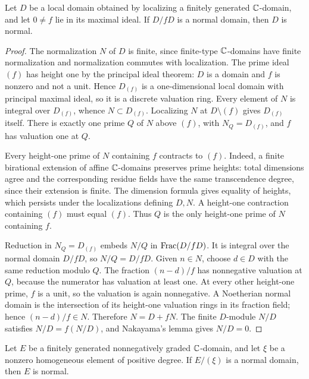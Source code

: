 \begin{lemma}\label{nb:deformation}
Let $D$ be a local domain obtained by localizing a finitely generated
$\mathbb C$-domain, and let $0\ne f$ lie in its maximal ideal. If $D/fD$
is a normal domain, then $D$ is normal.
\end{lemma}

\begin{proof}
The normalization $N$ of $D$ is finite, since finite-type
$\mathbb C$-domains have finite normalization and normalization commutes
with localization. The prime ideal $(f)$ has height one by the
principal ideal theorem: $D$ is a domain and $f$ is nonzero and
not a unit. Hence $D_{(f)}$ is a one-dimensional local domain with
principal maximal ideal, so it is a discrete valuation ring.
Every element of $N$ is integral over $D_{(f)}$, whence
$N\subset D_{(f)}$. Localizing $N$ at $D\setminus(f)$ gives
$D_{(f)}$ itself. There is exactly one prime $Q$ of $N$ above
$(f)$, with $N_Q=D_{(f)}$, and $f$ has valuation one at $Q$.

Every height-one prime of $N$ containing $f$ contracts to $(f)$.
Indeed, a finite birational extension of affine $\mathbb C$-domains
preserves prime heights: total dimensions agree and the corresponding
residue fields have the same transcendence degree, since their
extension is finite. The dimension formula gives equality of heights,
which persists under the localizations defining $D,N$. A height-one
contraction containing $(f)$ must equal $(f)$. Thus $Q$ is the only
height-one prime of $N$ containing $f$.

Reduction in $N_Q=D_{(f)}$ embeds $N/Q$ in $\operatorname{Frac}(D/fD)$.
It is integral over the normal domain $D/fD$, so $N/Q=D/fD$.
Given $n\in N$, choose $d\in D$ with the same reduction modulo $Q$.
The fraction $(n-d)/f$ has nonnegative valuation at $Q$, because the
numerator has valuation at least one. At every other height-one
prime, $f$ is a unit, so the valuation is again nonnegative. A
Noetherian normal domain is the intersection of its height-one
valuation rings in its fraction field; hence $(n-d)/f\in N$.
Therefore $N=D+fN$. The finite $D$-module $N/D$ satisfies
$N/D=f(N/D)$, and Nakayama's lemma gives $N/D=0$.
\end{proof}

\begin{corollary}\label{nb:graded-deformation}
Let $E$ be a finitely generated nonnegatively graded $\mathbb C$-domain,
and let $\xi$ be a nonzero homogeneous element of positive degree.
If $E/(\xi)$ is a normal domain, then $E$ is normal.
\end{corollary}

